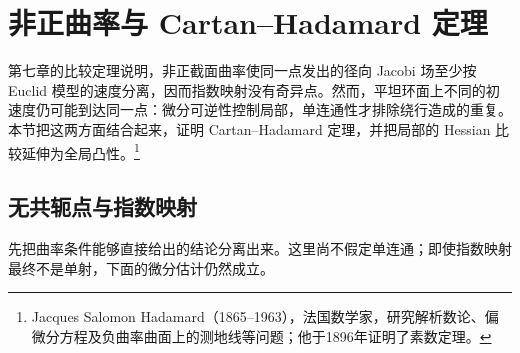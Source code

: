 
% 
% 

\section{非正曲率与 Cartan–Hadamard 定理}
\label{g3:sec:0901}

第七章的比较定理说明，非正截面曲率使同一点发出的径向 Jacobi 场至少按 Euclid 模型的速度分离，因而指数映射没有奇异点。然而，平坦环面上不同的初速度仍可能到达同一点：微分可逆性控制局部，单连通性才排除绕行造成的重复。本节把这两方面结合起来，证明 Cartan--Hadamard 定理，并把局部的 Hessian 比较延伸为全局凸性。\footnote{Jacques Salomon Hadamard（1865--1963），法国数学家，研究解析数论、偏微分方程及负曲率曲面上的测地线等问题；他于1896年证明了素数定理。}

\subsection{无共轭点与指数映射}
\label{g3:subsec:0901:01}

先把曲率条件能够直接给出的结论分离出来。这里尚不假定单连通；即使指数映射最终不是单射，下面的微分估计仍然成立。

